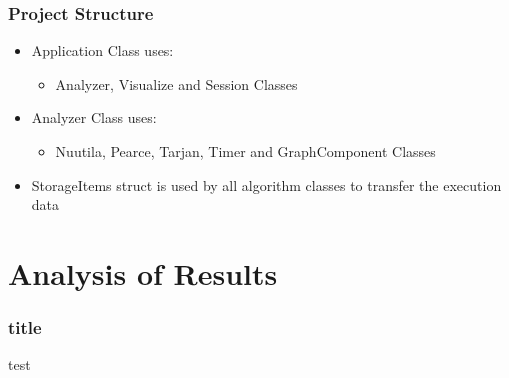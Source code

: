 \documentclass{beamer}
\begin{document}
		\begin{frame}
			\frametitle{Project Structure}
			\begin{itemize}
				\item <1-6> Application Class uses:
				\begin{itemize}
					\item <2-6> Analyzer, Visualize and Session Classes
				\end{itemize}
				\item <3-6> Analyzer Class uses:
				\begin{itemize}
					\item <4-6> Nuutila, Pearce, Tarjan, Timer and GraphComponent Classes
				\end{itemize}
				\item <5-6> StorageItems struct is used by all algorithm classes to transfer the execution data 
			\end{itemize}
		\end{frame}
	\section{Analysis of Results}
		\begin{frame}
			\frametitle{title}
		\end{frame}
	\begin{frame}
		test
	\end{frame}
\end{document}
